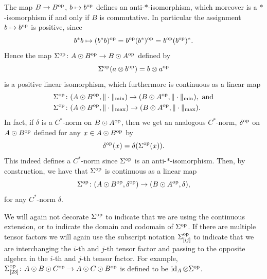 \documentclass[11pt, a4paper, oneside, final, reqno]{amsart}
\newcommand{\id}{\operatorname{id}}
\theoremstyle{definition}
\theoremstyle{plain}
\theoremstyle{remark}
\numberwithin{equation}{section}
\begin{document}
The map $B \to B^{\rm op}$, $b \mapsto b^{\rm op}$ defines an anti-$*$-isomorphism, which moreover is a $*$-isomorphism if and only if $B$ is commutative. In particular the assignment $b \mapsto b^{\rm op}$ is positive, since
\begin{equation*}
    b^*b \mapsto (b^*b)^{\rm op} = b^{\rm op}(b^*)^{\rm op} = b^{\rm op}(b^{\rm op})^*.
\end{equation*}
Hence the map $\Sigma^{\rm op} \colon A \odot B^{\rm op} \to B \odot A^{\rm op}$ defined by
\begin{equation*}
    \Sigma^{\rm op}(a \otimes b^{\rm op}) = b \otimes a^{\rm op}
\end{equation*}
is a positive linear isomorphism, which furthermore is continuous as a linear map
\begin{align*}
    \Sigma^{\rm op} & \colon (A \odot B^{\rm op}, \| \cdot \|_{\rm min}) \to (B \odot A^{\rm op}, \| \cdot \|_{\rm min}), \text{ and} \\
    \Sigma^{\rm op} & \colon (A \odot B^{\rm op}, \| \cdot \|_{\rm max}) \to (B \odot A^{\rm op}, \| \cdot \|_{\rm max}).
\end{align*}
In fact, if $\delta$ is a $C^*$-norm on $B \odot A^{\rm op}$, then we get an analogous $C^*$-norm, $\delta^{\rm op}$ on $A \odot B^{\rm op}$ defined for any $x \in A \odot B^{\rm op}$ by
\begin{equation*}
    \delta^{\rm op}(x) = \delta(\Sigma^{\rm op}(x)).
\end{equation*}
This indeed defines a $C^*$-norm since $\Sigma^{\rm op}$ is an anti-$*$-isomorphism. Then, by construction, we have that $\Sigma^{\rm op}$ is continuous as a linear map
\begin{equation*}
    \Sigma^{\rm op} \colon (A \odot B^{\rm op}, \delta^{\rm op}) \to (B \odot A^{\rm op}, \delta),
\end{equation*}
for any $C^*$-norm $\delta$.

We will again not decorate $\Sigma^{\rm op}$ to indicate that we are using the continuous extension, or to indicate the domain and codomain of $\Sigma^{\rm op}$. If there are multiple tensor factors we will again use the subscript notation $\Sigma_{[ij]}^{\rm op}$ to indicate that we are interchanging the $i$-th and $j$-th tensor factor and passing to the opposite algebra in the $i$-th and $j$-th tensor factor. For example, $\Sigma_{[23]}^{\rm op} \colon A \odot B \odot C^{\rm op} \to A \odot C \odot B^{\rm op}$ is defined to be $\id_A \otimes \Sigma^{\rm op}$.
\end{document}
